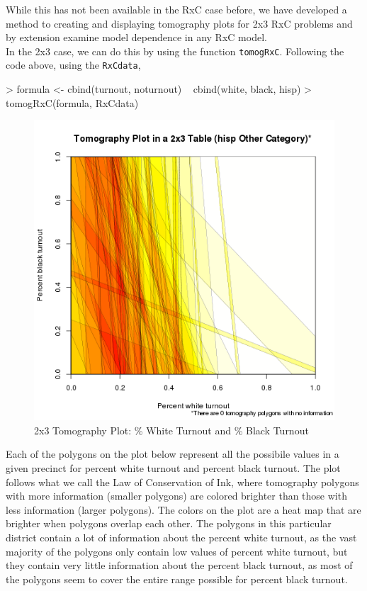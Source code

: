 \documentclass[11pt,oneside,letterpaper,titlepage]{article}
\begin{document}
\noindent While this has not been available in the RxC case before, we
have developed a method to creating and displaying tomography plots
for 2x3 RxC problems and by extension examine model dependence in any
RxC model.\\

\noindent In the 2x3 case, we can do this by using the function
\verb#tomogRxC#. Following the code above, using the \verb#RxCdata#,

\begin{Schunk}
\begin{Sinput}
> formula <- cbind(turnout, noturnout) ~ cbind(white, black, hisp)
> tomogRxC(formula, RxCdata)
\end{Sinput}
\end{Schunk}

\begin{figure}[Ht]
\begin{center}
\includegraphics{whiteblackRxC.png} 
\end{center}
\caption{2x3 Tomography Plot: \% White Turnout and \% Black Turnout}
\end{figure}

\noindent Each of the polygons on the plot below represent all the
possibile values in a given precinct for percent white turnout and
percent black turnout. The plot follows what we call the Law of
Conservation of Ink, where tomography polygons with more information
(smaller polygons) are colored brighter than those with less
information (larger polygons).  The colors on the plot are a heat map
that are brighter when polygons overlap each other. The polygons in
this particular district contain a lot of information about the
percent white turnout, as the vast majority of the polygons only
contain low values of percent white turnout, but they contain very
little information about the percent black turnout, as most of the
polygons seem to cover the entire range possible for percent black
turnout.
\end{document}
